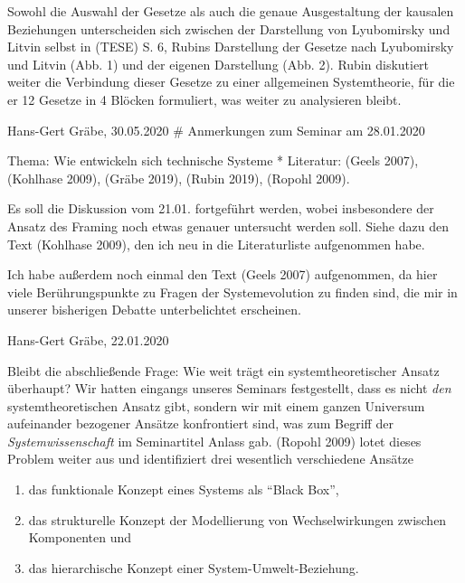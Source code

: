 \documentclass[11pt,a4paper]{article}
\begin{document}
Sowohl die Auswahl der Gesetze als auch die genaue Ausgestaltung der
kausalen Beziehungen unterscheiden sich zwischen der Darstellung von
Lyubomirsky und Litvin selbst in (TESE) S. 6, Rubins Darstellung der
Gesetze nach Lyubomirsky und Litvin (Abb. 1) und der eigenen Darstellung
(Abb. 2). Rubin diskutiert weiter die Verbindung dieser Gesetze zu einer
allgemeinen Systemtheorie, für die er 12 Gesetze in 4 Blöcken
formuliert, was weiter zu analysieren bleibt.

Hans-Gert Gräbe, 30.05.2020 \# Anmerkungen zum Seminar am 28.01.2020

Thema: Wie entwickeln sich technische Systeme * Literatur: (Geels 2007),
(Kohlhase 2009), (Gräbe 2019), (Rubin 2019), (Ropohl 2009).

Es soll die Diskussion vom 21.01. fortgeführt werden, wobei insbesondere
der Ansatz des Framing noch etwas genauer untersucht werden soll. Siehe
dazu den Text (Kohlhase 2009), den ich neu in die Literaturliste
aufgenommen habe.

Ich habe außerdem noch einmal den Text (Geels 2007) aufgenommen, da hier
viele Berührungspunkte zu Fragen der Systemevolution zu finden sind, die
mir in unserer bisherigen Debatte unterbelichtet erscheinen.

Hans-Gert Gräbe, 22.01.2020

Bleibt die abschließende Frage: Wie weit trägt ein systemtheoretischer
Ansatz überhaupt? Wir hatten eingangs unseres Seminars festgestellt,
dass es nicht \emph{den} systemtheoretischen Ansatz gibt, sondern wir
mit einem ganzen Universum aufeinander bezogener Ansätze konfrontiert
sind, was zum Begriff der \emph{Systemwissenschaft} im Seminartitel
Anlass gab. (Ropohl 2009) lotet dieses Problem weiter aus und
identifiziert drei wesentlich verschiedene Ansätze

\begin{enumerate}
[noitemsep]
\item
  das funktionale Konzept eines Systems als ``Black Box'',
\item
  das strukturelle Konzept der Modellierung von Wechselwirkungen
  zwischen Komponenten und
\item
  das hierarchische Konzept einer System-Umwelt-Beziehung.
\end{enumerate}
\end{document}
